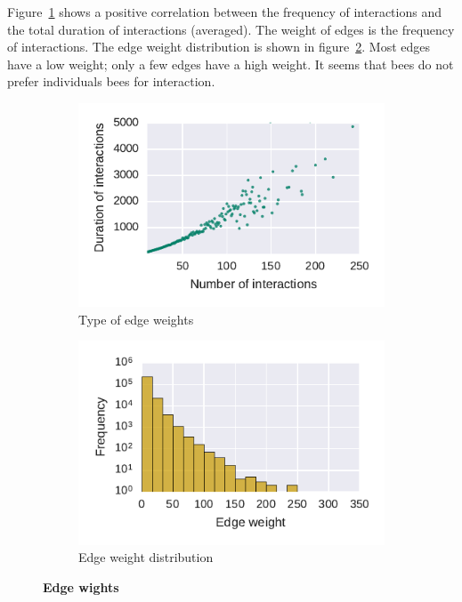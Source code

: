 Figure~\ref{fig:fVSd} shows a positive correlation between the frequency of interactions and the total duration of interactions (averaged).
 The weight of edges is the frequency of interactions.
The edge weight distribution is shown in figure~\ref{fig:edgeWdist}.
Most edges have a low weight; only a few edges have a high weight.
It seems that bees do not prefer individuals bees for interaction.



\begin{figure}[htb]
	\centering
	\begin{subfigure}[b]{0.49\textwidth}
	\centering
	\includegraphics[width=1.0\textwidth]{Figures/n3-freqVSduration}
	\caption[Type of edge weights]{Type of edge weights}
	\label{fig:fVSd}
	\end{subfigure} 
	\begin{subfigure}[b]{0.49\textwidth}
	\centering
	\includegraphics[width=1.0\textwidth]{Figures/n3-edgeWeightDist.pdf}
	\caption[Edge weight distribution]{Edge weight distribution}
	\label{fig:edgeWdist}
	\end{subfigure}
	\caption[Edge wights]{\textbf{Edge wights} }
	\label{fig:edges}
\end{figure}


